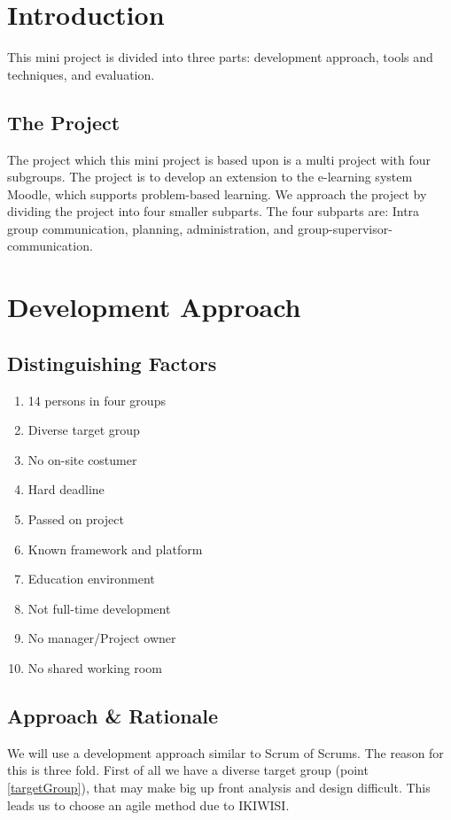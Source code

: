 \documentclass{article}
\begin{document}
\section{Introduction}
This mini project is divided into three parts: development approach, tools and techniques, and evaluation.
\subsection{The Project}
The project which this mini project is based upon is a multi project with four subgroups.
The project is to develop an extension to the e-learning system Moodle, which supports problem-based learning.
We approach the project by dividing the project into four smaller subparts.
The four subparts are: Intra group communication, planning, administration, and group-supervisor-communication.

\section{Development Approach}

\subsection{Distinguishing Factors}
\begin{enumerate}
	\item 14 persons in four groups \label{groupSize}
	\item Diverse target group \label{targetGroup}
	\item No on-site costumer \label{onsite}
	\item Hard deadline \label{deadline}
	\item Passed on project \label{passed}
	\item Known framework and platform \label{framework}
	\item Education environment \label{education}
	\item Not full-time development \label{halftime}
	\item No manager/Project owner \label{manager}
	\item No shared working room \label{room}
\end{enumerate}

\subsection{Approach \& Rationale}
We will use a development approach similar to Scrum of Scrums.
The reason for this is three fold.
First of all we have a diverse target group (point \ref{targetGroup}), that may make big up front analysis and design difficult.
This leads us to choose an agile method due to IKIWISI.
\end{document}
